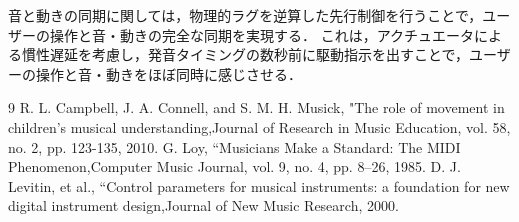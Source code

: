 \documentclass[uplatex,dvipdfmx]{jsarticle}
\begin{document}
音と動きの同期に関しては，物理的ラグを逆算した先行制御を行うことで，ユーザーの操作と音・動きの完全な同期を実現する．
これは，アクチュエータによる慣性遅延を考慮し，発音タイミングの数秒前に駆動指示を出すことで，ユーザーの操作と音・動きをほぼ同時に感じさせる．

\begin{thebibliography}{9}
 R. L. Campbell, J. A. Connell, and S. M. H. Musick, "The role of movement in children's musical understanding,Journal of Research in Music Education, vol. 58, no. 2, pp. 123-135, 2010.
 G. Loy, ``Musicians Make a Standard: The MIDI Phenomenon,Computer Music Journal, vol. 9, no. 4, pp. 8--26, 1985.
 D. J. Levitin, et al., ``Control parameters for musical instruments: a foundation for new digital instrument design,Journal of New Music Research, 2000.
\end{thebibliography}
\end{document}
